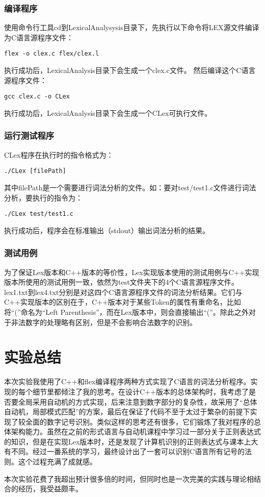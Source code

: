 \documentclass[twocolumn]{article}
\begin{document}
\subsubsection{编译程序}

使用命令行工具cd到LexicalAnalysysis目录下，先执行以下命令将LEX源文件编译为C语言源程序文件：
\begin{lstlisting}
flex -o clex.c flex/clex.l
\end{lstlisting}
执行成功后，LexicalAnalysis目录下会生成一个clex.c文件。
然后编译这个C语言源程序文件：
\begin{lstlisting}
gcc clex.c -o CLex
\end{lstlisting}
执行成功后，LexicalAnalysis目录下会生成一个CLex可执行文件。
\subsubsection{运行测试程序}

CLex程序在执行时的指令格式为：
\begin{lstlisting}
./CLex [filePath]
\end{lstlisting}
其中filePath是一个需要进行词法分析的文件。如：要对test/test1.c文件进行词法分析，要执行的指令为：
\begin{lstlisting}
./CLex test/test1.c
\end{lstlisting}
执行成功后，程序会在标准输出（stdout）输出词法分析的结果。

\subsubsection{测试用例}
为了保证Lex版本和C++版本的等价性，Lex实现版本使用的测试用例与C++实现版本所使用的测试用例一致，依然为test文件夹下的4个C语言源程序文件。lex1.txt到lex4.txt分别是对这四个C语言源程序文件的词法分析结果。它们与C++实现版本的区别在于，C++版本对于某些Token的属性有重命名，比如将“(”命名为“Left Parenthesis”，而在Lex版本中，则会直接输出“(”。除此之外对于非法数字的处理略有区别，但是不会影响合法数字的识别。
\section{实验总结}

本次实验我使用了C++和flex编译程序两种方式实现了C语言的词法分析程序。实现的每个细节里都倾注了我的思考。在设计C++版本的总体架构时，我考虑了是否要全局采用自动机的方式实现，后来注意到数字部分的复杂性，故采用了“总体自动机，局部模式匹配”的方案，最后在保证了代码不至于太过于繁杂的前提下实现了较全面的数字记号识别。类似这样的思考还有很多，它们锻炼了我对程序的总体架构能力。虽然在之前的形式语言与自动机课程中学习过一部分关于正则表达式的知识，但是在实现Lex版本时，还是发现了计算机识别的正则表达式与课本上大有不同。经过一番系统的学习，最终设计出了一套可以识别C语言所有记号的法则。这个过程充满了成就感。

本次实验花费了我超出预计很多倍的时间，但同时也是一次完美的实践与理论相结合的经历，我受益颇丰。
\end{document}
